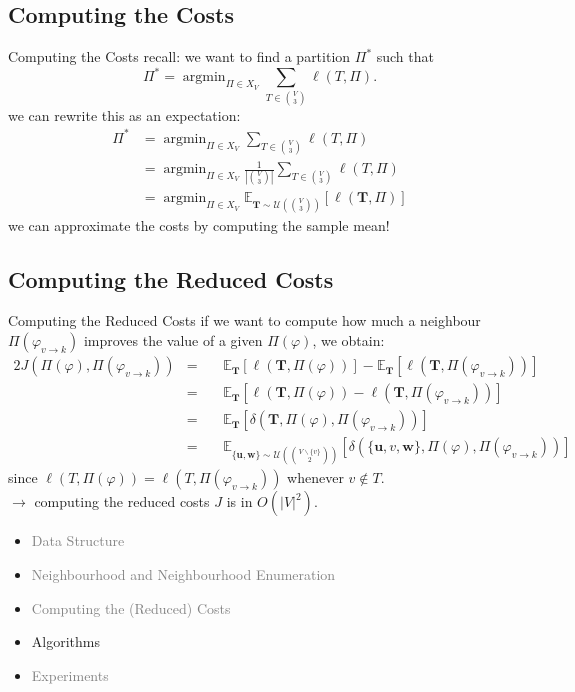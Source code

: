 \documentclass[10pt]{beamer}
\newcommand{\wf}{\mathbf{w}}
\newcommand{\uf}{\mathbf{u}}
\newcommand{\Tf}{\mathbf{T}}
\newcommand{\Uc}{\mathcal{U}}
\newcommand{\E}{\mathbb{E}}
\newcommand{\idx}{\varphi}
\newcommand{\move}[3]{#1_{#2\rightarrow #3}}
\DeclareMathOperator*{\argmin}{\arg\min}
\begin{document}
\subsection*{Computing the Costs}
\begin{frame}{Computing the Costs}
    recall: we want to find a partition $\Pi^*$ such that 
    $$ \Pi^* = \argmin_{\Pi \in X_V} \sum_{T \in \binom{V}{3}} \ell(T,\Pi). $$
    \pause
    we can rewrite this as an expectation:
    \begin{align*}
        \Pi^* &= \argmin_{\Pi \in X_V} \sum_{T \in \binom{V}{3}} \ell(T,\Pi) 
        \\ &= \argmin_{\Pi \in X_V} \frac{1}{|\binom{V}{3}|} \sum_{T \in \binom{V}{3}} \ell(T,\Pi)
        \\ &= \argmin_{\Pi \in X_V} \E_{\Tf \sim \Uc\left( \binom{V}{3} \right)} \left[ \ell(\Tf, \Pi) \right]
    \end{align*}
    \pause
    we can approximate the costs by computing the sample mean!
\end{frame}

\subsection*{Computing the Reduced Costs}
\begin{frame}{Computing the Reduced Costs}
    if we want to compute how much a neighbour $\Pi(\move{\idx}{v}{k})$ improves the value of a given $\Pi(\idx)$, we obtain:
    \begin{alignat*}{2}
        J( \Pi(\idx), \Pi(\move{\idx}{v}{k}) ) &= && \E_{\Tf}\left[ \ell(\Tf,\Pi(\idx)) \right] - \E_{\Tf}\left[ \ell(\Tf,\Pi(\move{\idx}{v}{k})) \right] \\ &=\ && \E_{\Tf}\left[ \ell(\Tf,\Pi(\idx)) - \ell(\Tf,\Pi(\move{\idx}{v}{k})) \right] \\ &= \ && \E_{\Tf}\left[ \delta(\Tf,\Pi(\idx),\Pi(\move{\idx}{v}{k})) \right] \\ &=\ && \E_{\{\uf,\wf\} \sim \Uc(\binom{V\backslash\{ v \}}{2})}\left[  \delta(\{\uf,v,\wf\},\Pi(\idx),\Pi(\move{\idx}{v}{k})) \right] 
    \end{alignat*}
    since $\ell(T,\Pi(\idx)) = \ell(T,\Pi(\move{\idx}{v}{k}))$ whenever $v \not\in T$.\\
    $\rightarrow$ computing the reduced costs $J$ is in $O(|V|^2)$.
\end{frame}


\begin{frame}
    \begin{itemize}
        \item \textcolor{gray}{Data Structure}
        \item \textcolor{gray}{Neighbourhood and Neighbourhood Enumeration}
        \item \textcolor{gray}{Computing the (Reduced) Costs}
        \item Algorithms
        \item \textcolor{gray}{Experiments}
    \end{itemize}
\end{frame}
\end{document}
